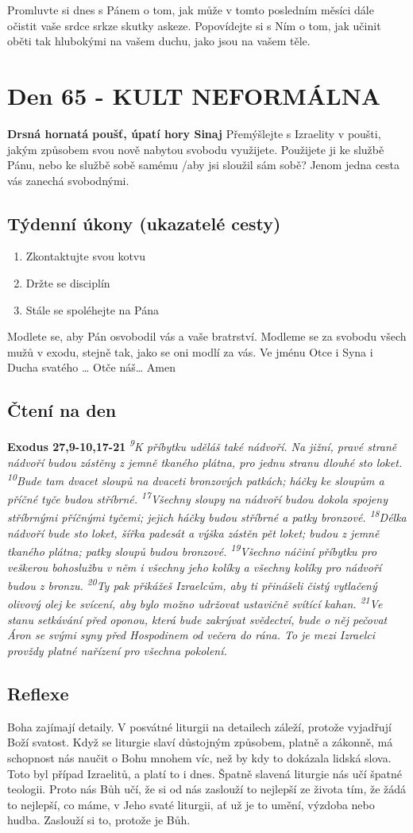 \documentclass[11pt]{article}
\newcommand{\zacatekDesatyTyden}{
\textbf{Drsná hornatá poušť, úpatí hory Sinaj} \newline 
Přemýšlejte s Izraelity v poušti, jakým způsobem svou nově nabytou svobodu využijete. Použijete ji ke službě Pánu, nebo ke službě sobě samému /aby jsi sloužil sám sobě? Jenom jedna cesta vás zanechá svobodnými.

\subsection*{Týdenní úkony (ukazatelé cesty)}
\begin{enumerate}
  \item Zkontaktujte svou kotvu
  \item Držte se disciplín
  \item Stále se spoléhejte na Pána
\end{enumerate}
Modlete se, aby Pán osvobodil vás a vaše bratrství. \newline
Modleme se za svobodu všech mužů v exodu, stejně tak, jako se oni modlí za vás.\newline
Ve jménu Otce i Syna i Ducha svatého …  Otče náš… Amen
}
\begin{document}
Promluvte si dnes s Pánem o tom, jak může v tomto posledním měsíci dále očistit vaše srdce srkze skutky
askeze. Popovídejte si s Ním o tom, jak učinit oběti tak hlubokými na vašem duchu, jako jsou na vašem těle.





\newpage
\section{Den 65 - KULT NEFORMÁLNA }
\zacatekDesatyTyden
\subsection*{Čtení na den}
\textbf{Exodus 27,9-10,17-21}
\newline
\textit{
\textsuperscript{9}K příbytku uděláš také nádvoří. Na jižní, pravé straně nádvoří budou zástěny z jemně tkaného plátna, pro jednu stranu dlouhé sto loket.
\textsuperscript{10}Bude tam dvacet sloupů na dvaceti bronzových patkách; háčky ke sloupům a příčné tyče budou stříbrné.
\newline
\newline
\textsuperscript{17}Všechny sloupy na nádvoří budou dokola spojeny stříbrnými příčnými tyčemi; jejich háčky budou stříbrné a patky bronzové.
\textsuperscript{18}Délka nádvoří bude sto loket, šířka padesát a výška zástěn pět loket; budou z jemně tkaného plátna; patky sloupů budou bronzové.
\textsuperscript{19}Všechno náčiní příbytku pro veškerou bohoslužbu v něm i všechny jeho kolíky a všechny kolíky pro nádvoří budou z bronzu.
\textsuperscript{20}Ty pak přikážeš Izraelcům, aby ti přinášeli čistý vytlačený olivový olej ke svícení, aby bylo možno udržovat ustavičně svítící kahan.
\textsuperscript{21}Ve stanu setkávání před oponou, která bude zakrývat svědectví, bude o něj pečovat Áron se svými syny před Hospodinem od večera do rána. To je mezi Izraelci provždy platné nařízení pro všechna pokolení.
}

\subsection*{Reflexe}

Boha zajímají detaily. V posvátné liturgii na detailech záleží, protože vyjadřují Boží svatost. Když se liturgie slaví
důstojným způsobem, platně a zákonně, má schopnost nás naučit o Bohu mnohem víc, než by kdy to dokázala lidská
slova. Toto byl případ Izraelitů, a platí to i dnes. Špatně slavená liturgie nás učí špatné teologii. Proto nás Bůh učí, že si
od nás zaslouží to nejlepší ze života tím, že žádá to nejlepší, co máme, v Jeho svaté liturgii, ať už je to umění, výzdoba
nebo hudba. Zaslouží si to, protože je Bůh.
\end{document}
